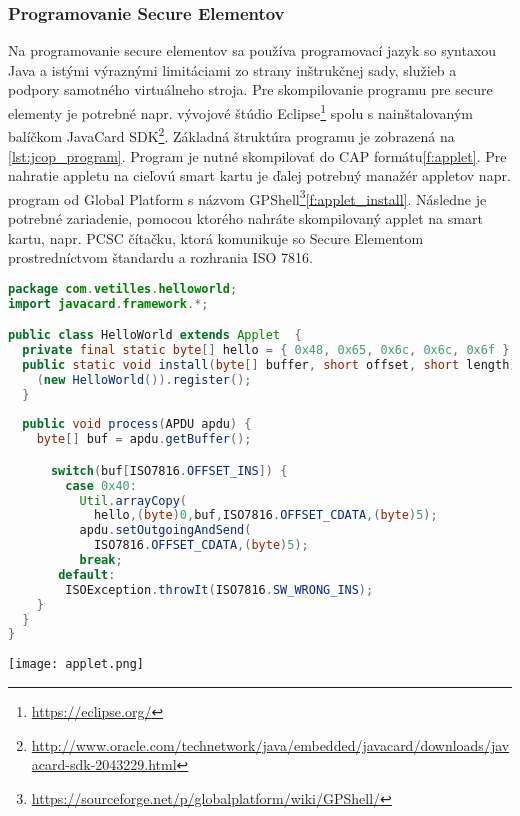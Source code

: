 \documentclass[12pt,a4wide,oneside,openright]{report}
\begin{document}
\subsubsection{Programovanie Secure Elementov}
Na programovanie secure elementov sa používa programovací jazyk so syntaxou Java a istými výraznými limitáciami zo strany inštrukčnej sady, služieb a podpory samotného virtuálneho stroja. Pre skompilovanie programu pre secure elementy je potrebné napr. vývojové štúdio Eclipse\footnote{\url{https://eclipse.org/}} spolu s nainštalovaným balíčkom JavaCard SDK\footnote{\url{http://www.oracle.com/technetwork/java/embedded/javacard/downloads/javacard-sdk-2043229.html}}.
Základná štruktúra programu je zobrazená na \ref{lst:jcop_program}. Program je nutné skompilovať do CAP formátu\ref{f:applet}.
Pre nahratie appletu na cieľovú smart kartu je ďalej potrebný manažér appletov napr. program od Global Platform s názvom GPShell\footnote{\url{https://sourceforge.net/p/globalplatform/wiki/GPShell/}}\ref{f:applet_install}. Následne je potrebné zariadenie, pomocou ktorého nahráte skompilovaný applet na smart kartu, napr. PCSC čítačku, ktorá komunikuje so Secure Elementom prostredníctvom štandardu a rozhrania ISO 7816.
\begin{lstlisting}[caption={Hello World na platforme JCOP. \protect\cite{jchelloworld}}, label={lst:jcop_program}, language=java] 
package com.vetilles.helloworld;
import javacard.framework.*;

public class HelloWorld extends Applet  {
  private final static byte[] hello = { 0x48, 0x65, 0x6c, 0x6c, 0x6f };
  public static void install(byte[] buffer, short offset, short length) {
    (new HelloWorld()).register();
  }
	
  public void process(APDU apdu) {
    byte[] buf = apdu.getBuffer(); 

      switch(buf[ISO7816.OFFSET_INS]) {
        case 0x40:
          Util.arrayCopy(
            hello,(byte)0,buf,ISO7816.OFFSET_CDATA,(byte)5);
          apdu.setOutgoingAndSend(
            ISO7816.OFFSET_CDATA,(byte)5);
          break;
       default:
        ISOException.throwIt(ISO7816.SW_WRONG_INS); 
    }
  }
}
\end{lstlisting}
\onehalfspacing

\begin{figure*}[h]
	\centering
	\texttt{[image: applet.png]}
	\caption{Kompilácia appletu do CAP formátu. \cite{javacardinstruction}}
	\label{f:applet}
\end{figure*}
\end{document}
